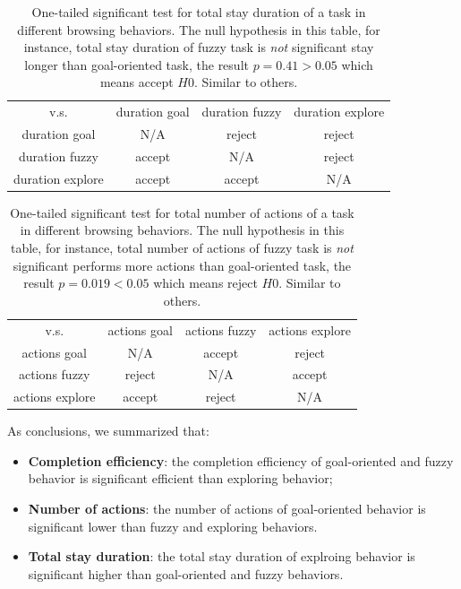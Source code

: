 \begin{table}[H]
    \small
    \centering
    \caption{One-tailed significant test for total stay duration of a task in different browsing behaviors.
    The null hypothesis in this table, for instance, total stay duration of fuzzy task
    is \emph{not} significant stay longer than goal-oriented task, the result $p=0.41>0.05$ which means
    accept $H0$. Similar to others.}
        \begin{tabular}{cccc}
            \toprule
              v.s.             & duration goal & duration fuzzy & duration explore \\
            duration goal      & N/A & reject & reject \\
            duration fuzzy     & accept & N/A & reject \\
            duration explore   & accept & accept & N/A \\
            \bottomrule
        \end{tabular}
        \label{table:sig-test-duration}
\end{table}

\begin{table}[H]
    \small
    \centering
    \caption{One-tailed significant test for total number of actions of a task in different browsing behaviors.
    The null hypothesis in this table, for instance, total number of actions of fuzzy task
    is \emph{not} significant performs more actions than goal-oriented task, the result $p=0.019<0.05$ which means
    reject $H0$. Similar to others.}
        \begin{tabular}{cccc}
            \toprule
              v.s.             & actions goal & actions fuzzy & actions explore \\
              actions goal      & N/A & accept & reject \\
              actions fuzzy     & reject & N/A & accept \\
              actions explore   & accept & reject & N/A \\
            \bottomrule
        \end{tabular}
        \label{table:sig-test-actions}
\end{table}

As conclusions, we summarized that:

\begin{itemize}
    \item \textbf{Completion efficiency}: the completion efficiency of goal-oriented and fuzzy behavior is significant efficient than exploring behavior;
    \item \textbf{Number of actions}: the number of actions of goal-oriented behavior is significant lower than fuzzy and exploring behaviors.
    \item \textbf{Total stay duration}: the total stay duration of explroing behavior is significant higher than goal-oriented and fuzzy behaviors.
\end{itemize}

